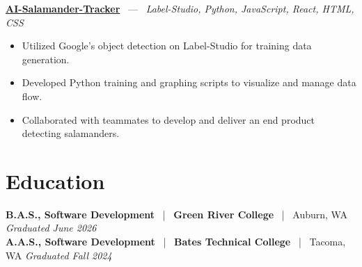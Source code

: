 \documentclass[10pt, letterpaper]{article}
\newcommand{\jobhead}[4]{%
  \vspace{5pt}%
  {\bfseries\color{dark}#1}%
  ~{\color{light}|}~%
  {\bfseries\color{navy}#2}%
  ~{\color{light}|}~%
  {\color{light}#3}%
  \hfill{\color{light}\small\textit{#4}}\\[-2pt]%
}
\newcommand{\projhead}[3]{%
  \vspace{5pt}%
  {\bfseries\color{dark}\href{#2}{#1}}%
  ~{\color{light}---}~%
  {\color{light}\small\textit{#3}}\\[-2pt]%
}
\begin{document}
\projhead{AI-Salamander-Tracker}{https://github.com/xavierb117/Salamander-Tracker-YOLO}{Label-Studio, Python, JavaScript, React, HTML, CSS}
\begin{itemize}
  \item Utilized Google's object detection on Label-Studio for training data generation.
  \item Developed Python training and graphing scripts to visualize and manage data flow.
  \item Collaborated with teammates to develop and deliver an end product detecting salamanders.
\end{itemize}

\section{Education}

\jobhead{B.A.S., Software Development}{Green River College}{Auburn, WA}{Graduated June 2026}
\jobhead{A.A.S., Software Development}{Bates Technical College}{Tacoma, WA}{Graduated Fall 2024}
\end{document}
